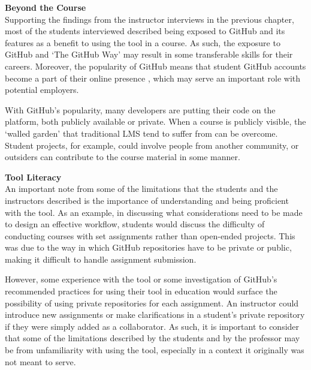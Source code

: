 \textbf{Beyond the Course} \\
Supporting the findings from the instructor interviews in the previous chapter, most of the students interviewed described being exposed to GitHub and its features as a benefit to using the tool in a course. As such, the exposure to GitHub and `The GitHub Way' may result in some transferable skills for their careers. Moreover, the popularity of GitHub means that student GitHub accounts become a part of their online presence \cite{treude2012programming}, which may serve an important role with potential employers.

With GitHub's popularity, many developers are putting their code on the platform, both publicly available or private. When a course is publicly visible, the `walled garden' that traditional LMS tend to suffer from \cite{mott2010envisioning} can be overcome. Student projects, for example, could involve people from another community, or outsiders can contribute to the course material in some manner.

\textbf{Tool Literacy} \\
An important note from some of the limitations that the students and the instructors described is the importance of understanding and being proficient with the tool. As an example, in discussing what considerations need to be made to design an effective workflow, students would discuss the difficulty of conducting courses with set assignments rather than open-ended projects. This was due to the way in which GitHub repositories have to be private or public, making it difficult to handle assignment submission.

However, some experience with the tool or some investigation of GitHub's recommended practices for using their tool in education would surface the possibility of using private repositories for each assignment. An instructor could introduce new assignments or make clarifications in a student's private repository if they were simply added as a collaborator. As such, it is important to consider that some of the limitations described by the students and by the professor may be from unfamiliarity with using the tool, especially in a context it originally was not meant to serve.




